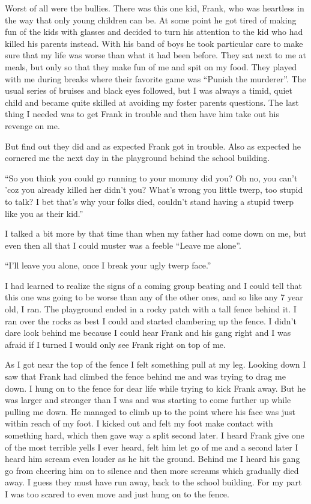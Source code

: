 \documentclass[12pt,letterpaper]{article}
\begin{document}
Worst of all were the bullies. There was this one kid, Frank, who was heartless in the way that only young children can be. At some point he got tired of making fun of the kids with glasses and decided to turn his attention to the kid who had killed his parents instead. With his band of boys he took particular care to make sure that my life was worse than what it had been before. They sat next to me at meals, but only so that they make fun of me and spit on my food. They played with me during breaks where their favorite game was ``Punish the murderer''. The usual series of bruises and black eyes followed, but I was always a timid, quiet child and became quite skilled at avoiding my foster parents questions. The last thing I needed was to get Frank in trouble and then have him take out his revenge on me.

But find out they did and as expected Frank got in trouble. Also as expected he cornered me the next day in the playground behind the school building.

``So you think you could go running to your mommy did you? Oh no, you can't 'coz you already killed her didn't you? What's wrong you little twerp, too stupid to talk? I bet that's why your folks died, couldn't stand having a stupid twerp like you as their kid.''

I talked a bit more by that time than when my father had come down on me, but even then all that I could muster was a feeble  ``Leave me alone''.

``I'll leave you alone, once I break your ugly twerp face.''

I had learned to realize the signs of a coming group beating and I could tell that this one was going to be worse than any of the other ones, and so like any 7 year old, I ran. The playground ended in a rocky patch with a tall fence behind it. I ran over the rocks as best I could and started clambering up the fence. I didn't dare look behind me because I could hear Frank and his gang right and I was afraid if I turned I would only see Frank right on top of me.

As I got near the top of the fence I felt something pull at my leg. Looking down I saw that Frank had climbed the fence behind me and was trying to drag me down. I hung on to the fence for dear life while trying to kick Frank away. But he was larger and stronger than I was and was starting to come further up while pulling me down. He managed to climb up to the point where his face was just within reach of my foot. I kicked out and felt my foot make contact with something hard, which then gave way a split second later. I heard Frank give one of the most terrible yells I ever heard, felt him let go of me and a second later I heard him scream even louder as he hit the ground. Behind me I heard his gang go from cheering him on to silence and then more screams which gradually died away. I guess they must have run away, back to the school building. For my part I was too scared to even move and just hung on to the fence.
\end{document}
